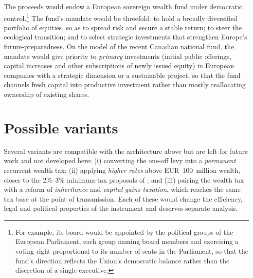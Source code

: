 \documentclass[../../main]{subfiles}
\begin{document}
The proceeds would endow a European sovereign wealth fund under democratic control.\footnote{For example, its board would be appointed by the political groups of the European Parliament, each group naming board members and exercising a voting right proportional to its number of seats in the Parliament, so that the fund's direction reflects the Union's democratic balance rather than the discretion of a single executive.} 
The fund's mandate would be threefold: to hold a broadly diversified portfolio of equities, so as to spread risk and secure a stable return; to steer the ecological transition; and to select strategic investments that strengthen Europe's future-preparedness. On the model of the recent Canadian national fund, the mandate would give
priority to \emph{primary} investments (initial public offerings, capital increases and other subscriptions of newly issued equity) in European companies with a strategic dimension or a sustainable project, so that the fund channels fresh capital into productive investment rather than mostly reallocating ownership of existing shares.

\section{Possible variants}
\label{sec:variants}

Several variants are compatible with the architecture above but are left for future work and not developed here: (i) converting the one-off levy into a \emph{permanent} recurrent wealth tax; (ii) applying \emph{higher rates} above EUR~100~million wealth, closer %
to the 2\%--3\% minimum-tax proposals of \citet{Zucman2024}; and (iii) pairing the wealth tax with a reform of \emph{inheritance} and \emph{capital gains taxation}, which reaches the same tax base at the point of transmission. %
Each of these would change the efficiency, legal and political properties of the instrument and deserves separate analysis.


{}
\end{document}
